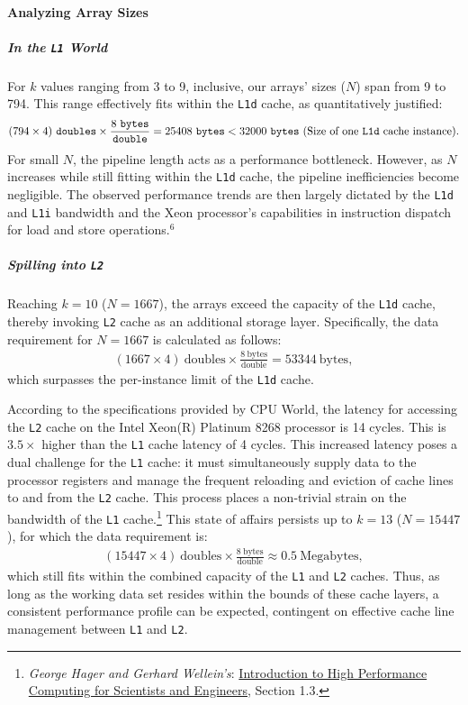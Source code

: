 \documentclass{article}
\begin{document}
\paragraph*{Analyzing Array Sizes}
\subparagraph*{In the \texttt{L1} World}
\noindent For $k$ values ranging from 3 to 9, inclusive, our arrays' sizes (\(N\)) span from 9 to 794. This range effectively fits within the \texttt{L1d} cache, as quantitatively justified:
\begin{align*}
    (794 \times 4)\ \texttt{doubles} \times \frac{8\ \texttt{bytes}}{\texttt{double}} = 25408\ \texttt{bytes} < 32000\ \texttt{bytes}\ (\text{Size of one \texttt{L1d} cache instance}).
\end{align*}
For small \(N\), the pipeline length acts as a performance bottleneck. However, as \(N\) increases while still fitting within the \texttt{L1d} cache, the pipeline inefficiencies become negligible. 
The observed performance trends are then largely dictated by the \texttt{L1d} and \texttt{L1i} bandwidth and the Xeon processor's capabilities in instruction dispatch for load and store operations.$^6$

\subparagraph*{Spilling into \texttt{L2}}
Reaching \( k = 10 \) (\( N = 1667 \)), the arrays exceed the capacity of the \texttt{L1d} cache, thereby invoking \texttt{L2} cache as an additional storage layer. Specifically, the data requirement for \( N = 1667 \) is calculated as follows:
\begin{align*}
    (1667 \times 4)\ \text{doubles} \times \frac{8\ \text{bytes}}{\text{double}} = 53344\ \text{bytes},
\end{align*}
which surpasses the per-instance limit of the \texttt{L1d} cache.

According to the specifications provided by CPU World, the latency for accessing the \texttt{L2} cache on the Intel Xeon(R) Platinum 8268 processor is 14 cycles. This is \( 3.5 \times \) higher than the \texttt{L1} cache latency of 4 cycles.
This increased latency poses a dual challenge for the \texttt{L1} cache: it must simultaneously supply data to the processor registers and manage the frequent reloading and eviction of cache lines to and from the \texttt{L2} cache. This process places a non-trivial strain on the bandwidth of the \texttt{L1} cache.\footnote{\textit{George Hager and Gerhard Wellein's}: \underline{Introduction to High Performance Computing for Scientists and Engineers}, Section 1.3.}
This state of affairs persists up to \( k = 13 \) (\( N = 15447 \)), for which the data requirement is:
\begin{align*}
    (15447 \times 4)\ \text{doubles} \times \frac{8\ \text{bytes}}{\text{double}} \approx 0.5\ \text{Megabytes},
\end{align*}
which still fits within the combined capacity of the \texttt{L1} and \texttt{L2} caches. Thus, as long as the working data set resides within the bounds of these cache layers, a consistent performance profile can be expected, contingent on effective cache line management between \texttt{L1} and \texttt{L2}.
\end{document}
